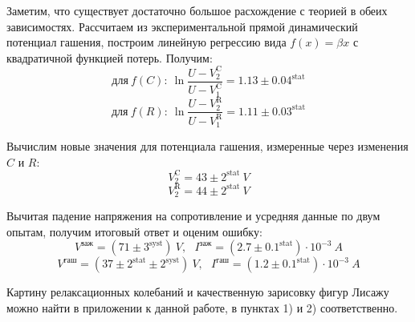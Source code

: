 Заметим, что существует достаточно большое расхождение с теорией в обеих зависимостях. Рассчитаем из экспериментальной прямой динамический потенциал гашения, построим линейную регрессию вида $f(x) = \beta x$ с квадратичной функцией потерь. Получим:
$$\text{для}~f(C):~ \ln {\frac{U - V_2^{\text{C}}}{U - V_1^{\text{C}}}} = 1.13 \pm 0.04^{\text{stat}}$$
$$\text{для}~f(R):~ \ln {\frac{U - V_2^{\text{R}}}{U - V_1^{\text{R}}}} = 1.11 \pm 0.03^{\text{stat}}$$

Вычислим новые значения для потенциала гашения, измеренные через изменения $C$ и $R$:
$$\boxed{V_2^{\text{C}} = 43 \pm 2^{\text{stat}}~V}$$
$$\boxed{V_2^{\text{R}} = 44 \pm 2^{\text{stat}}~V}$$

Вычитая падение напряжения на сопротивление и усредняя данные по двум опытам, получим итоговый ответ и оценим ошибку:
$$\boxed{V^{\text{заж}} = (71 \pm 3^{\text{syst}})~V,~~~I^{\text{заж}} = (2.7 \pm 0.1^{\text{stat}}) \cdot 10^{-3}~A}$$
$$\boxed{V^{\text{гаш}} = (37 \pm 2^{\text{stat}} \pm 2^{\text{syst}} )~V,~~~I^{\text{гаш}} = (1.2 \pm 0.1^{\text{stat}}) \cdot 10^{-3}~A}$$

Картину релаксационных колебаний и качественную зарисовку фигур Лисажу можно найти в приложении к данной работе, в пунктах 1) и 2) соответственно.

